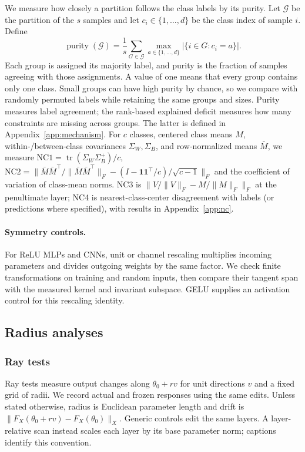 We measure how closely a partition follows the class labels by its purity. Let $\mathcal G$ be the partition of the $s$ samples and let $c_i\in\{1,\ldots,d\}$ be the class index of sample $i$. Define
\[
 \operatorname{purity}(\mathcal G)
 =\frac1s\sum_{G\in\mathcal G}\max_{a\in\{1,\ldots,d\}}
       \bigl|\{i\in G:c_i=a\}\bigr|.
\]
Each group is assigned its majority label, and purity is the fraction of samples agreeing with those assignments. A value of one means that every group contains only one class. Small groups can have high purity by chance, so we compare with randomly permuted labels while retaining the same groups and sizes. Purity measures label agreement; the rank-based explained deficit measures how many constraints are missing across groups. The latter is defined in Appendix~\ref{app:mechanism}. For $c$ classes, centered class means $M$, within-/between-class covariances $\Sigma_W,\Sigma_B$, and row-normalized means $\bar M$, we measure $\mathrm{NC1}=\operatorname{tr}(\Sigma_W\Sigma_B^+)/c$, $\mathrm{NC2}=\|\bar M\bar M^\top/\|\bar M\bar M^\top\|_F-(I-\mathbf1\mathbf1^\top/c)/\sqrt{c-1}\|_F$ and the coefficient of variation of class-mean norms. NC3 is $\|V/\|V\|_F-M/\|M\|_F\|_F$ at the penultimate layer; NC4 is nearest-class-center disagreement with labels (or predictions where specified), with results in Appendix~\ref{app:nc}.

\paragraph{Symmetry controls.}
For ReLU MLPs and CNNs, unit or channel rescaling multiplies incoming parameters and divides outgoing weights by the same factor. We check finite transformations on training and random inputs, then compare their tangent span with the measured kernel and invariant subspace. GELU supplies an activation control for this rescaling identity.

\subsection{Radius analyses}

\label{app:methods-radius}
\subsubsection{Ray tests}
Ray tests measure output changes along $\theta_0+rv$ for unit directions $v$ and a fixed grid of radii. We record actual and frozen responses using the same edits. Unless stated otherwise, radius is Euclidean parameter length and drift is $\|F_X(\theta_0+rv)-F_X(\theta_0)\|_X$. Generic controls edit the same layers. A layer-relative scan instead scales each layer by its base parameter norm; captions identify this convention.

